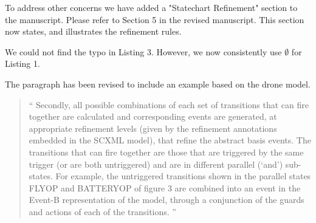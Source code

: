 \documentclass{response}
\begin{document}
\begin{comment}{Reviewer \#1}
• p.2 The three rules are not at the same level. The first ones are expressed 
explicitely in terms of Event-B refinement features, while the third one 
addresses statecharts.
\end{comment}

\begin{response}
  To address other concerns we have added a "Statechart Refinement" section 
  to the manuscript. Please refer to Section 5 in the revised manuscript.
  This section now states, and illustrates the refinement rules.
\end{response}


\begin{comment}{Reviewer \#1}
• p. 10 typo? listing 3 l. 10 \emptyset
\end{comment}

\begin{response}
  We could not find the typo in Listing 3. However, we now
  consistently use $\emptyset$ for Listing 1.
\end{response}

\begin{comment}{Reviewer \#1}
• p.13 Could you illustrate the sentence all possible combinations of each
set of transitions that can fire together are calculated and corresponding
events are generated, at appropriate refinement levels.
\end{comment}

\begin{response}
  The paragraph has been revised to include an example based on the drone model.
  \begin{quote}
    `` Secondly, all possible combinations of each set of transitions that can
    fire together are calculated and corresponding events are generated, at
    appropriate refinement levels (given by the refinement annotations
    embedded in the SCXML model), that refine the abstract basis events. The
    transitions that can fire together are those that are triggered by the same
    trigger (or are both untriggered) and are in different parallel (‘and’)
    sub-states. For example, the untriggered transitions shown in the parallel
    states FLYOP and BATTERYOP of figure 3 are combined into an event in the Event-B 
    representation of the model, through a conjunction of the guards and actions 
    of each of the transitions.  ''
  \end{quote}
\end{response}
\end{document}
